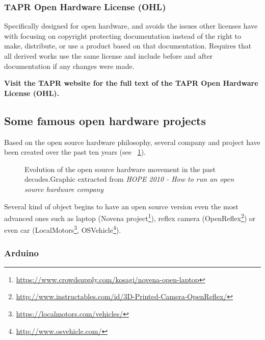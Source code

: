 \subsubsection{TAPR Open Hardware License (OHL)}
Specifically designed for open hardware, and avoids the issues other licenses have with focusing on copyright protecting documentation instead of the right to make, distribute, or use a product based on that documentation. Requires that all derived works use the same license and include before and after documentation if any changes were made.

\textbf{Visit the TAPR website for the full text of the TAPR Open Hardware License (OHL).}


\subsection{Some famous open hardware projects} %

Based on the open source hardware philosophy, several company and project have been created over the past ten years (see \figurename~\ref{fig:oh_evolution}).

\begin{figure}[h]
\centering
    \hfil
    \caption{Evolution of the open source hardware movement in the past decades.Graphic extracted from \emph{HOPE 2010 - How to run an open source hardware company}}
    \label{fig:oh_evolution}
\end{figure}


Several kind of object begins to have an open source version even the most advanced ones such as laptop (Novena project\footnote{\url{https://www.crowdsupply.com/kosagi/novena-open-laptop}}), reflex camera (OpenReflex\footnote{\url{http://www.instructables.com/id/3D-Printed-Camera-OpenReflex/}}) or even car (LocalMotors\footnote{\url{https://localmotors.com/vehicles/}}, OSVehicle\footnote{\url{http://www.osvehicle.com/}}).


\subsubsection{Arduino} %

